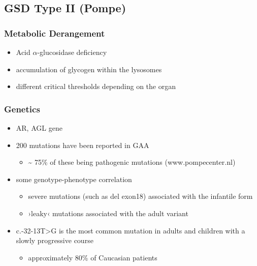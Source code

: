 \documentclass{scrartcl}
\begin{document}
\subsection{GSD Type II (Pompe)}
\label{sec:org902570a}
\subsubsection{Metabolic Derangement}
\label{sec:org200cdab}
\begin{itemize}
\item Acid \(\alpha\)-glucosidase deficiency
\item accumulation of glycogen within the lysosomes
\item different critical thresholds depending on the organ
\end{itemize}

\subsubsection{Genetics}
\label{sec:org00c32e1}
\begin{itemize}
\item AR, AGL gene
\item 200 mutations have been reported in GAA
\begin{itemize}
\item \textasciitilde{} 75\% of these being pathogenic mutations (www.pompecenter.nl)
\end{itemize}
\item some genotype-phenotype correlation
\begin{itemize}
\item severe mutations (such as del exon18) associated with the infantile form
\item ›leaky‹ mutations associated with the adult variant
\end{itemize}
\item c.-32-13T>G is the most common mutation in adults and children with
a slowly progressive course
\begin{itemize}
\item approximately 80\% of Caucasian patients
\end{itemize}
\end{itemize}
\end{document}
